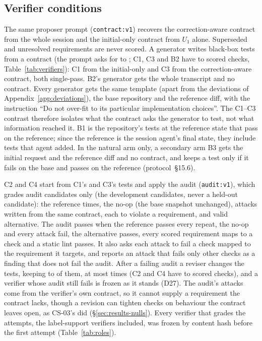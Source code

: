 \subsection{Verifier conditions}
\label{sec:design-conditions}
The same proposer prompt (\texttt{contract:v1}) recovers the correction-aware contract from the whole session and the initial-only contract from $U_1$ alone. Superseded and unresolved requirements are never scored. A generator writes black-box tests from a contract (the prompt asks for  to ; C1, C3 and B2 have  to  scored checks, Table~\ref{tab:verifiers}): C1 from the initial-only and C3 from the correction-aware contract, both single-pass. B2's generator gets the whole transcript and no contract. Every generator gets the same template (apart from the deviations of Appendix~\ref{app:deviations}), the base repository and the reference diff, with the instruction ``Do not over-fit to its particular implementation choices''. The C1--C3 contrast therefore isolates what the contract asks the generator to test, not what information reached it. B1 is the repository's tests at the reference state that pass on the reference; since the reference is the session agent's final state, they include tests that agent added. In the natural arm only, a secondary arm B3 gets the initial request and the reference diff and no contract, and keeps a test only if it fails on the base and passes on the reference (protocol~\S15.6).

C2 and C4 start from C1's and C3's tests and apply the audit (\texttt{audit:v1}), which grades audit candidates only (the development candidates, never a held-out candidate): the reference  times, the no-op (the base snapshot unchanged),  attacks written from the same contract, each to violate a requirement, and  valid alternative. The audit passes when the reference passes every repeat, the no-op and every attack fail, the alternative passes, every scored requirement maps to a check and a static lint passes. It also asks each attack to fail a check mapped to the requirement it targets, and reports an attack that fails only other checks as a finding that does not fail the audit. After a failing audit a reviser changes the tests, keeping  to  of them, at most  times (C2 and C4 have  to  scored checks), and a verifier whose audit still fails is frozen as it stands (D27). The audit's attacks come from the verifier's own contract, so it cannot supply a requirement the contract lacks, though a revision can tighten checks on behaviour the contract leaves open, as CS-03's did (\S\ref{sec:results-nulls}). Every verifier that grades the attempts, the label-support verifiers included, was frozen by content hash before the first attempt (Table~\ref{tab:roles}).

